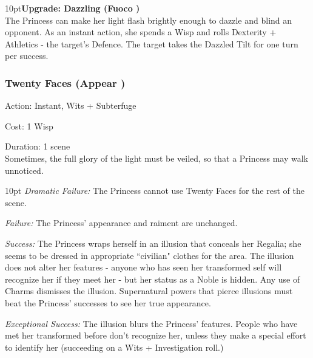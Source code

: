 \begin{myindentpar}{10pt}\textbf{Upgrade: Dazzling (Fuoco \textbullet)}\\

\noindent The Princess can make her light flash brightly enough to dazzle and blind an opponent. As an instant action, she spends a Wisp and rolls Dexterity + Athletics - the target's Defence. The target takes the Dazzled Tilt for one turn per success.\end{myindentpar}

\subsubsection*{Twenty Faces (Appear \textbullet)}

\noindent Action: Instant, Wits + Subterfuge

\noindent Cost: 1 Wisp 

\noindent Duration: 1 scene \\

\noindent Sometimes, the full glory of the light must be veiled, so that a Princess may walk unnoticed.

\begin{myindentpar}{10pt}
    \emph{Dramatic Failure:} The Princess cannot use Twenty Faces for the rest of the scene.

    \emph{Failure:} The Princess' appearance and raiment are unchanged.

    \emph{Success:} The Princess wraps herself in an illusion that conceals her Regalia; she seems to be dressed in appropriate \textquotedblleft civilian" clothes for the area. The illusion does not alter her features - anyone who has seen her transformed self will recognize her if they meet her - but her status as a Noble is hidden. Any use of Charms dismisses the illusion. Supernatural powers that pierce illusions must beat the Princess' successes to see her true appearance.

    \emph{Exceptional Success:} The illusion blurs the Princess' features. People who have met her transformed before don't recognize her, unless they make a special effort to identify her (succeeding on a Wits + Investigation roll.)
\end{myindentpar}
    
